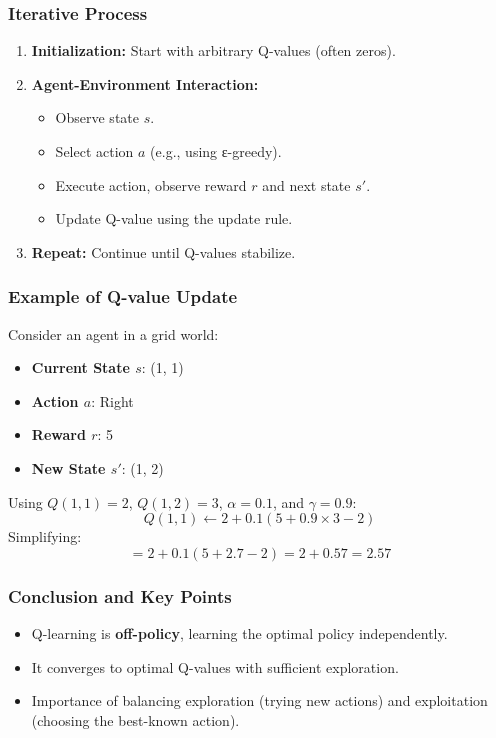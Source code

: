 \documentclass[aspectratio=169]{beamer}
\begin{document}
\begin{frame}[fragile]
    \frametitle{Iterative Process}
    \begin{enumerate}
        \item \textbf{Initialization:} Start with arbitrary Q-values (often zeros).
        \item \textbf{Agent-Environment Interaction:}
            \begin{itemize}
                \item Observe state \( s \).
                \item Select action \( a \) (e.g., using ε-greedy).
                \item Execute action, observe reward \( r \) and next state \( s' \).
                \item Update Q-value using the update rule.
            \end{itemize}
        \item \textbf{Repeat:} Continue until Q-values stabilize.
    \end{enumerate}
\end{frame}

\begin{frame}[fragile]
    \frametitle{Example of Q-value Update}
    Consider an agent in a grid world:
    \begin{itemize}
        \item \textbf{Current State \( s \)}: (1, 1)
        \item \textbf{Action \( a \)}: Right
        \item \textbf{Reward \( r \)}: 5
        \item \textbf{New State \( s' \)}: (1, 2)
    \end{itemize}
    
    Using \( Q(1, 1) = 2 \), \( Q(1, 2) = 3 \), \( \alpha = 0.1 \), and \( \gamma = 0.9 \):
    \[
    Q(1, 1) \leftarrow 2 + 0.1 \left( 5 + 0.9 \times 3 - 2 \right)
    \]
    Simplifying:
    \[
    = 2 + 0.1(5 + 2.7 - 2) = 2 + 0.57 = 2.57
    \]
\end{frame}

\begin{frame}[fragile]
    \frametitle{Conclusion and Key Points}
    \begin{itemize}
        \item Q-learning is \textbf{off-policy}, learning the optimal policy independently.
        \item It converges to optimal Q-values with sufficient exploration.
        \item Importance of balancing exploration (trying new actions) and exploitation (choosing the best-known action).
    \end{itemize}
\end{frame}
\end{document}

